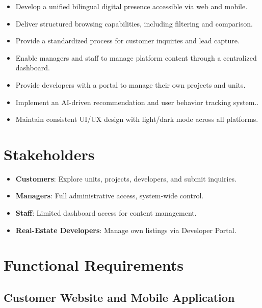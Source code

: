 \documentclass[12pt]{article}
\begin{document}
\begin{itemize}[noitemsep]
    \item Develop a unified bilingual digital presence accessible via web and mobile.
    \item Deliver structured browsing capabilities, including filtering and comparison.
    \item Provide a standardized process for customer inquiries and lead capture.
    \item Enable managers and staff to manage platform content through a centralized dashboard.
    \item Provide developers with a portal to manage their own projects and units.
    \item Implement an AI-driven recommendation and user behavior tracking system..
    \item Maintain consistent UI/UX design with light/dark mode across all platforms.
\end{itemize}

\section{Stakeholders}

\begin{itemize}[noitemsep]
    \item \textbf{Customers}: Explore units, projects, developers, and submit inquiries.
    \item \textbf{Managers}: Full administrative access, system-wide control.
    \item \textbf{Staff}: Limited dashboard access for content management.
    \item \textbf{Real-Estate Developers}: Manage own listings via Developer Portal.
\end{itemize}

\section{Functional Requirements}

\subsection{Customer Website and Mobile Application}
\end{document}
